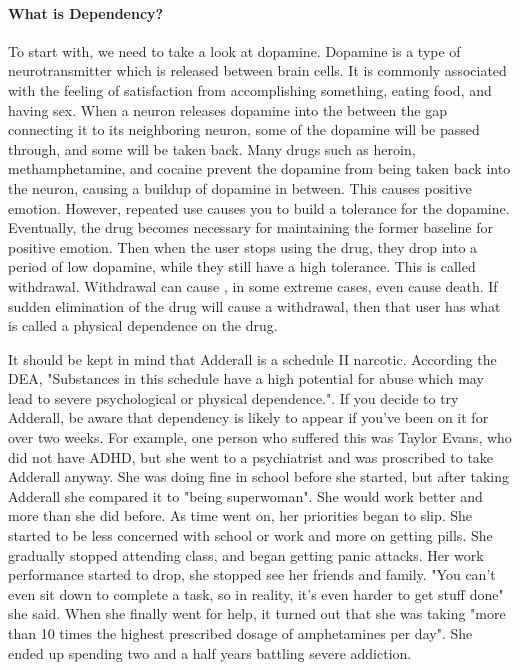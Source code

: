 \documentclass{article}
\begin{document}
                \paragraph{What is Dependency?} To start with, we need to take a look at dopamine. Dopamine is a type of neurotransmitter which is released between brain cells. It is commonly associated with the feeling of satisfaction from accomplishing something, eating food, and having sex. When a neuron releases dopamine into the between the gap connecting it to its neighboring neuron, some of the dopamine will be passed through, and some will be taken back.
                Many drugs such as heroin, methamphetamine, and cocaine prevent the dopamine from being taken back into the neuron, causing a buildup of dopamine in between. This causes positive emotion. However, repeated use causes you to build a tolerance for the dopamine. 
                Eventually, the drug becomes necessary for maintaining the former baseline for positive emotion. Then when the user stops using the drug, they drop into a period of low dopamine, while they still have a high tolerance. This is called withdrawal. Withdrawal can cause 
                , in some extreme cases, even cause death. If sudden elimination of the drug will cause a withdrawal, then that user has what is called a physical dependence on the drug.
                
                It should be kept in mind that Adderall is a schedule II narcotic. According the DEA, "Substances in this schedule have a high potential for abuse which may lead to severe psychological or physical dependence."\cite{DOJ}. If you decide to try Adderall, be aware that dependency is likely to appear if you've been on it for over two weeks.\cite{tardner22} 
                For example, one person who suffered this was Taylor Evans, who did not have ADHD, but she went to a psychiatrist and was proscribed to take Adderall anyway. She was doing fine in school before she started, but after taking Adderall she compared it to "being superwoman"\cite{marshall15}. She would work better and more than she did before. As time went on, her priorities began to slip. She started to be less concerned with school or work and more on getting pills. She gradually stopped attending class, and began getting panic attacks. Her work performance started to drop, she stopped see her friends and family. "You can’t even sit down to complete a task, so in reality, it’s even harder to get stuff done" she said. When she finally went for help, it turned out that she was taking "more than 10 times the highest prescribed dosage of amphetamines per day"\cite{marshall15}. She ended up spending two and a half years battling severe addiction. 
                
\end{document}
